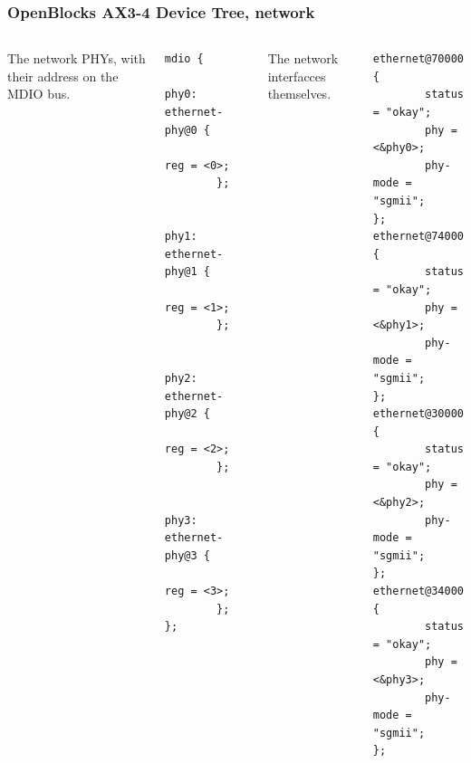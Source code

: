 \begin{frame}[fragile]
  \frametitle{OpenBlocks AX3-4 Device Tree, network}
  \begin{columns}[t]
     The network PHYs, with their address on the
    MDIO bus.
    \begin{block}{}
      \begin{verbatim}
mdio {
        phy0: ethernet-phy@0 {
                reg = <0>;
        };

        phy1: ethernet-phy@1 {
                reg = <1>;
        };

        phy2: ethernet-phy@2 {
                reg = <2>;
        };

        phy3: ethernet-phy@3 {
                reg = <3>;
        };
};
    \end{verbatim}
    \end{block}
    The network interfacces themselves.
    \begin{block}{}
      \begin{verbatim}
ethernet@70000 {
        status = "okay";
        phy = <&phy0>;
        phy-mode = "sgmii";
};
ethernet@74000 {
        status = "okay";
        phy = <&phy1>;
        phy-mode = "sgmii";
};
ethernet@30000 {
        status = "okay";
        phy = <&phy2>;
        phy-mode = "sgmii";
};
ethernet@34000 {
        status = "okay";
        phy = <&phy3>;
        phy-mode = "sgmii";
};
    \end{verbatim}
    \end{block}
  \end{columns}
\end{frame}

